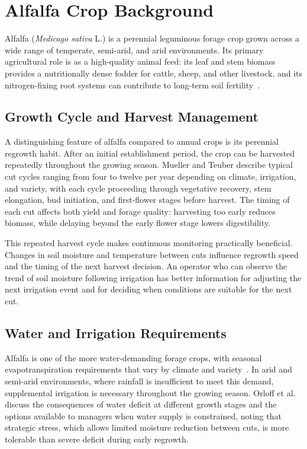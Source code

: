 \section{Alfalfa Crop Background}
\label{sec:alfalfa-background}

Alfalfa (\textit{Medicago sativa} L.) is a perennial leguminous forage crop grown
across a wide range of temperate, semi-arid, and arid environments. Its primary
agricultural role is as a high-quality animal feed: its leaf and stem biomass
provides a nutritionally dense fodder for cattle, sheep, and other livestock, and
its nitrogen-fixing root systems can contribute to long-term soil
fertility~\cite{fao_alflafa_crop_water}.

\subsection{Growth Cycle and Harvest Management}
\label{subsec:alfalfa-growth}

A distinguishing feature of alfalfa compared to annual crops is its perennial
regrowth habit. After an initial establishment period, the crop can be harvested
repeatedly throughout the growing season. Mueller and Teuber
\cite{mueller2007alfalfa_growth_development} describe typical cut cycles ranging
from four to twelve per year depending on climate, irrigation, and variety,
with each cycle proceeding through vegetative recovery, stem elongation, bud
initiation, and first-flower stages before harvest. The timing of each cut affects
both yield and forage quality: harvesting too early reduces biomass, while
delaying beyond the early flower stage lowers digestibility.

This repeated harvest cycle makes continuous monitoring practically beneficial.
Changes in soil moisture and temperature between cuts influence regrowth speed and
the timing of the next harvest decision. An operator who can observe the trend of
soil moisture following irrigation has better information for adjusting the next
irrigation event and for deciding when conditions are suitable for the next cut.

\subsection{Water and Irrigation Requirements}
\label{subsec:alfalfa-water}

Alfalfa is one of the more water-demanding forage crops, with seasonal
evapotranspiration requirements that vary by climate and
variety~\cite{irmak2007irrigation_alfalfa}. In arid and semi-arid environments,
where rainfall is insufficient to meet this demand, supplemental irrigation is
necessary throughout the growing season. Orloff et
al.~\cite{orloff2015drought_strategies_alfalfa} discuss the consequences of water
deficit at different growth stages and the options available to managers when
water supply is constrained, noting that strategic stress, which allows limited
moisture reduction between cuts, is more tolerable than severe deficit during
early regrowth.

